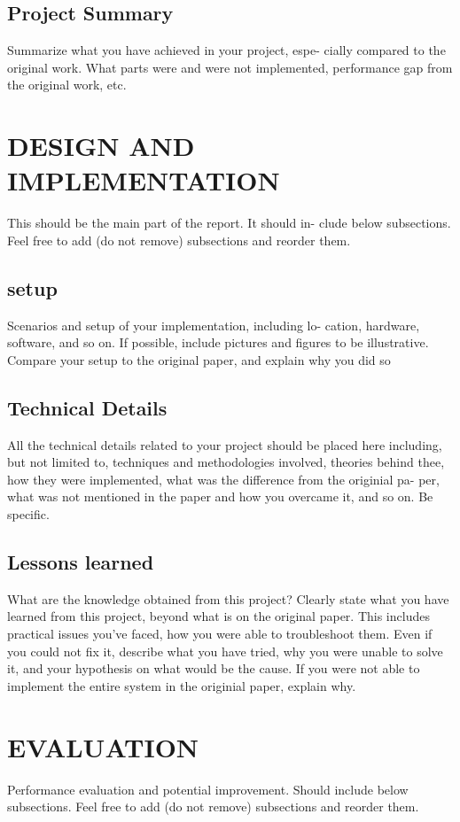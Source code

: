 \documentclass{acm_proc_article-sp}
\begin{document}
\subsection{Project Summary}
Summarize  what  you  have  achieved  in  your  project,  espe-
cially compared to the original work.  What parts were and
were  not  implemented,  performance  gap  from  the  original
work, etc.

\section{DESIGN AND IMPLEMENTATION}
This should be the main part of the report.  It should in-
clude below subsections.  Feel free to add (do not remove)
subsections and reorder them.

\subsection{setup}
Scenarios  and  setup  of  your  implementation,  including  lo-
cation,  hardware,  software,  and so on.  If possible,  include
pictures and figures to be illustrative.  Compare your setup
to the original paper, and explain why you did so

\subsection{Technical Details}
All  the  technical  details  related  to  your  project  should  be
placed  here  including,  but  not  limited  to,  techniques  and
methodologies involved, theories behind thee, how they were
implemented, what was the difference from the originial pa-
per,  what  was  not  mentioned  in  the  paper  and  how  you
overcame it, and so on.  Be specific.

\subsection{Lessons learned}
What are the knowledge obtained from this project? Clearly
state what you have learned from this project, beyond what
is on the original paper. This includes practical issues you’ve
faced, how you were able to troubleshoot them.  Even if you
could not fix it, describe what you have tried, why you were
unable to solve it, and your hypothesis on what would be the
cause.  If you were not able to implement the entire system
in the originial paper, explain why.

\section{EVALUATION}
Performance evaluation and potential improvement.  Should
include below subsections.  Feel free to add (do not remove)
subsections and reorder them.
\end{document}
